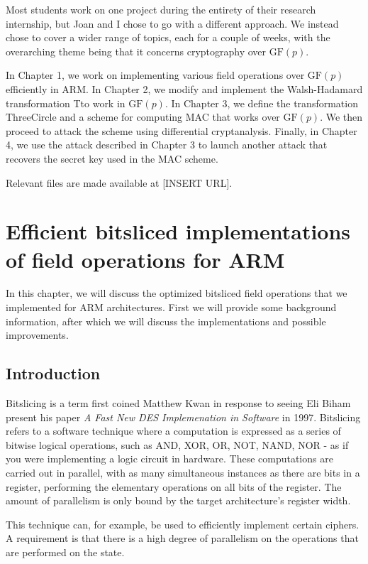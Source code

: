 \documentclass{report}
\newcommand{\GF}{\text{GF}}
\newcommand{\ThreeCircle}{{\sc ThreeCircle} }
\begin{document}
Most students work on one project during the entirety of their research internship, but Joan and I chose to go with a different approach.
We instead chose to cover a wider range of topics, each for a couple of weeks, with the overarching theme being that it concerns cryptography over $\GF(p)$.

In Chapter 1, we work on implementing various field operations over $\GF(p)$ efficiently in ARM. In Chapter 2, we modify and implement the Walsh-Hadamard transformation Tto work in $\GF(p)$. In Chapter 3, we define the transformation \ThreeCircle and a scheme for computing MAC that works over $\GF(p)$. We then proceed to attack the scheme using differential cryptanalysis. Finally, in Chapter 4, we use the attack described in Chapter 3 to launch another attack that recovers the secret key used in the MAC scheme.

Relevant files are made available at [INSERT URL].


\chapter{Efficient bitsliced implementations of field operations for ARM}

In this chapter, we will discuss the optimized bitsliced field operations that we implemented for ARM architectures. First we will provide some background information, after which we will discuss the implementations and possible improvements.

\section{Introduction}
Bitslicing is a term first coined Matthew Kwan in response to seeing Eli Biham present his paper \textit{A Fast New DES Implemenation in Software} in 1997.\cite{kwan1998bitslice}
Bitslicing refers to a software technique where a computation is expressed as a series of bitwise logical operations, such as AND, XOR, OR, NOT, NAND, NOR - as if you were implementing a logic circuit in hardware.
These computations are carried out in parallel, with as many simultaneous instances as there are bits in a register, performing the elementary operations on all bits of the register. The amount of parallelism is only bound by the target architecture's register width.

This technique can, for example, be used to efficiently implement certain ciphers. A requirement is that there is a high degree of parallelism on the operations that are performed on the state.
\end{document}
